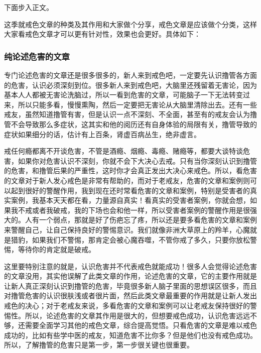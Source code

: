 下面步入正文。

这季就戒色文章的种类及其作用和大家做个分享，戒色文章是应该做个分类，这样大家看戒色文章才可以更有针对性，效果也会更好。具体如下：

\subsubsection{纯论述危害的文章}

专门论述危害的文章还是很多很多的，新人来到戒色吧，一定要先认识撸管各方面的危害，认识必须深刻到位。很多新人来到戒色吧，大脑里还残留着无害论，因为基本人人都被无害论洗脑过，所以一看到危害的文章，可能脑子一下无法转变过来，所以只能多看，慢慢熏陶，然后一定要把无害论从大脑里清除出去。还有一些戒友，虽然知道撸管有害，但是认识一点不深刻、不全面，甚至有的戒友会认为撸管不会导致那么多症状，这其实和他的阅历还有自身体验的局限有关，撸管导致的症状如果细分的话，估计有上百条，肾虚百病丛生，绝非虚言。

戒任何瘾都离不开谈危害，不管是酒瘾、烟瘾、毒瘾、赌瘾等，都要大谈特谈危害，如果你对危害认识不深刻，你就不会下大决心去戒。只有当你深刻认识到撸管的危害，和撸管后果的严重性，这时你才会真正发出大决心来戒色。所以，看危害的文章对于新人发心戒色是非常有帮助的，而对于老戒友，危害的文章和案例则可以起到很好的警醒作用，我到现在还时常看危害的文章和案例，特别是受害者的真实案例，我基本天天都在看，力量源自真实！看真实的受害者案例，你就会想，如果我不戒或者我破戒，我的下场也会和他一样，所以受害者案例的警醒作用是很强大的。人有一个弱点，那就是好了伤疤忘了疼，所以还是要多看危害的文章和案例来警醒自己，让自己保持良好的警惕意识。我们就像非洲大草原上的羚羊，心魔就是猎豹，如果我们不警惕，那肯定会被心魔吞噬，不管你戒了多久，只要你放松警惕，等待你的肯定就是破戒。

这里要特别注意的就是，认识危害并不代表戒色就能成功！很多人会觉得论述危害的文章没用，其实他误解了此类文章的作用，论述危害的文章，它的主要作用就是让新人真正深刻认识到撸管的危害，毕竟很多新人脑子里面的思想误区很多，而且对撸管危害的认识很肤浅或者很片面，然后此类文章最重要的作用就是让新人发出戒色的决心；对于老戒友来说，多看危害的文章和案例可以让老戒友保持很好的警惕性。所以，论述危害的文章其作用是很大的，但想要戒色成功，认识危害远远不够，还需要全面学习其他的戒色文章，综合提高觉悟。只看危害的文章是难以戒色成功的，比如有些学中医的戒友，知道危害不比你多？但是他们也没有戒色成功。所以，了解撸管的危害只是第一步，第一步很关键也很重要。

